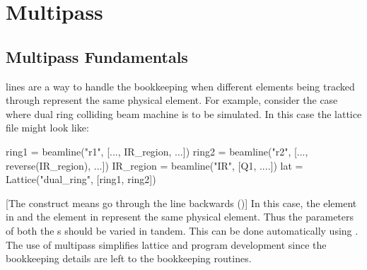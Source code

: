 \chapter{Multipass}
\label{c:multipass}

\section{Multipass Fundamentals}
\label{s:multipass.fund}

 lines are a way to handle the bookkeeping when different elements being tracked
through represent the same physical element. For example, consider the case where dual ring colliding
beam machine is to be simulated. In this case the lattice file might look like:
\begin{example}
  ring1 = beamline("r1", [..., IR_region, ...])
  ring2 = beamline("r2", [..., reverse(IR_region), ...])
  IR_region = beamline("IR", [Q1, ....])
  lat = Lattice("dual_ring", [ring1, ring2])
\end{example}
[The  construct means go through the line backwards ()] 
In this case, the  element in  and the
 element in  represent the same physical element.
Thus the parameters
of both the s should be varied in tandem. This can be done automatically using .
The use of multipass simplifies lattice and program development since the bookkeeping details are left
to the \accellat bookkeeping routines.

